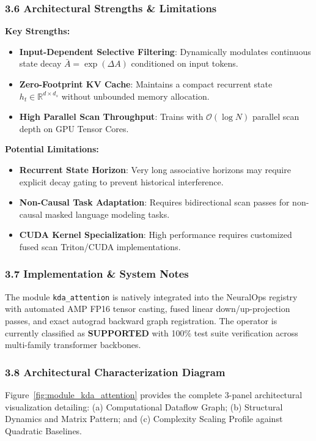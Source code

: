\subsubsection*{3.6 Architectural Strengths \& Limitations}
\textbf{Key Strengths:}
\begin{itemize}
    \item \textbf{Input-Dependent Selective Filtering}: Dynamically modulates continuous state decay $\bar{A} = \exp(\Delta A)$ conditioned on input tokens.
    \item \textbf{Zero-Footprint KV Cache}: Maintains a compact recurrent state $h_t \in \mathbb{R}^{d \times d_s}$ without unbounded memory allocation.
    \item \textbf{High Parallel Scan Throughput}: Trains with $\mathcal{O}(\log N)$ parallel scan depth on GPU Tensor Cores.
\end{itemize}

\textbf{Potential Limitations:}
\begin{itemize}
    \item \textbf{Recurrent State Horizon}: Very long associative horizons may require explicit decay gating to prevent historical interference.
    \item \textbf{Non-Causal Task Adaptation}: Requires bidirectional scan passes for non-causal masked language modeling tasks.
    \item \textbf{CUDA Kernel Specialization}: High performance requires customized fused scan Triton/CUDA implementations.
\end{itemize}

\subsubsection*{3.7 Implementation \& System Notes}
The module \texttt{kda\_attention} is natively integrated into the NeuralOps registry with automated AMP FP16 tensor casting, fused linear down/up-projection passes, and exact autograd backward graph registration. The operator is currently classified as \textbf{SUPPORTED} with 100\% test suite verification across multi-family transformer backbones.

\subsubsection*{3.8 Architectural Characterization Diagram}
Figure~\ref{fig:module_kda_attention} provides the complete 3-panel architectural visualization detailing: (a) Computational Dataflow Graph; (b) Structural Dynamics and Matrix Pattern; and (c) Complexity Scaling Profile against Quadratic Baselines.

